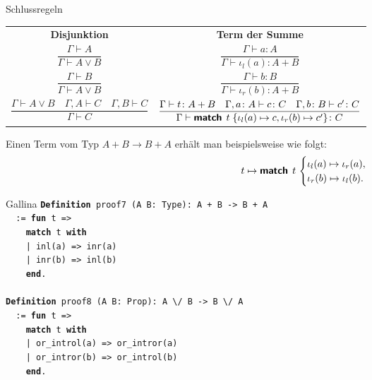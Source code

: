 \documentclass[8pt]{beamer}
\newcommand{\strong}[1]{\textsf{\textbf{#1}}}
\newcommand{\kw}[1]{\textbf{#1}}
\begin{document}
\begin{frame}
\begin{block}{Schlussregeln}
\begin{center}
\begin{tabular}{c@{\qquad\qquad}c}
\strong{Disjunktion}
& \strong{Term der Summe}\\[10pt]
$\dfrac{\Gamma\vdash A}{\Gamma\vdash A\lor B}$
& $\dfrac{\Gamma\vdash a\colon A}{\Gamma\vdash\iota_l(a)\colon A+B}$\\[18pt]
$\dfrac{\Gamma\vdash B}{\Gamma\vdash A\lor B}$
& $\dfrac{\Gamma\vdash b\colon B}{\Gamma\vdash\iota_r(b)\colon A+B}$\\[18pt]
$\dfrac{\Gamma\vdash A\lor B\quad\Gamma,A\vdash C\quad\Gamma,B\vdash C}{\Gamma\vdash C}$
& $\dfrac{\Gamma\vdash t\colon A+B\quad\Gamma,a\colon A\vdash c\colon C
  \quad\Gamma,b\colon B\vdash c'\colon C}{\Gamma\vdash\strong{match}\;\,t\;\{\iota_l(a)\mapsto c, \iota_r(b)\mapsto c'\}\colon C}$
\end{tabular}
\end{center}
\end{block}
\end{frame}

\begin{frame}
Einen Term vom Typ $A+B\to B+A$ erhält man beispielsweise wie folgt:\pause
\[t\mapsto\strong{match}\;\,t\,\begin{cases}
\iota_l(a)\mapsto\iota_r(a),\\
\iota_r(b)\mapsto\iota_l(b).
\end{cases}\]\pause
\begin{block}{Gallina}
\texttt{\kw{Definition} proof7 (A B: Type): A + B -> B + A\\
\ \ := \kw{fun} t =>\\
\ \ \ \ \kw{match} t \kw{with}\\
\ \ \ \ | inl(a) => inr(a)\\
\ \ \ \ | inr(b) => inl(b)\\
\ \ \ \ \kw{end}.}\\
\mbox{}\\
\texttt{\kw{Definition} proof8 (A B: Prop): A {\textbackslash}/ B -> B {\textbackslash}/ A\\
\ \ := \kw{fun} t =>\\
\ \ \ \ \kw{match} t \kw{with}\\
\ \ \ \ | or\_introl(a) => or\_intror(a)\\
\ \ \ \ | or\_intror(b) => or\_introl(b)\\
\ \ \ \ \kw{end}.}
\end{block}
\end{frame}
\end{document}
